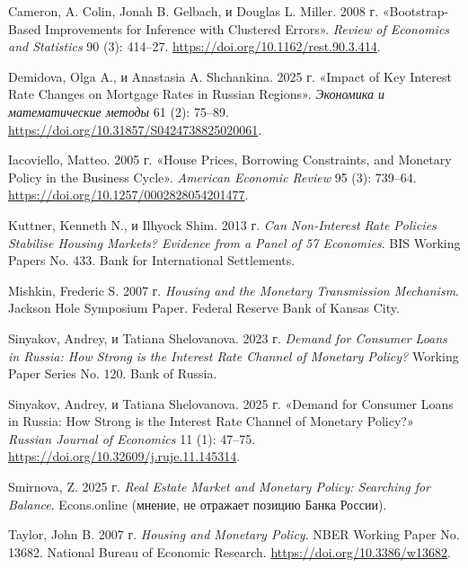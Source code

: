 \documentclass[
  russian,
  11pt,
]{article}
\newlength{\cslhangindent}
\newenvironment{CSLReferences}[2] %
 {\begin{list}{}{%
  \setlength{\itemindent}{0pt}
  \setlength{\leftmargin}{0pt}
  \setlength{\parsep}{0pt}
  \ifodd #1
   \setlength{\leftmargin}{\cslhangindent}
   \setlength{\itemindent}{-1\cslhangindent}
  \fi
  \setlength{\itemsep}{#2\baselineskip}}}
 {\end{list}}
\begin{document}
\protect{}\label{refs}
\begin{CSLReferences}{1}{1}
Cameron, A. Colin, Jonah B. Gelbach, и Douglas L. Miller. 2008 г.
{«Bootstrap-Based Improvements for Inference with Clustered Errors»}.
\emph{Review of Economics and Statistics} 90 (3): 414--27.
\url{https://doi.org/10.1162/rest.90.3.414}.

Demidova, Olga A., и Anastasia A. Shchankina. 2025 г. {«Impact of Key
Interest Rate Changes on Mortgage Rates in Russian Regions»}.
\emph{Экономика и математические методы} 61 (2): 75--89.
\url{https://doi.org/10.31857/S0424738825020061}.

Iacoviello, Matteo. 2005 г. {«House Prices, Borrowing Constraints, and
Monetary Policy in the Business Cycle»}. \emph{American Economic Review}
95 (3): 739--64. \url{https://doi.org/10.1257/0002828054201477}.

Kuttner, Kenneth N., и Ilhyock Shim. 2013 г. \emph{Can Non-Interest Rate
Policies Stabilise Housing Markets? Evidence from a Panel of 57
Economies}. BIS Working Papers No. 433. Bank for International
Settlements.

Mishkin, Frederic S. 2007 г. \emph{Housing and the Monetary Transmission
Mechanism}. Jackson Hole Symposium Paper. Federal Reserve Bank of Kansas
City.

Sinyakov, Andrey, и Tatiana Shelovanova. 2023 г. \emph{Demand for
Consumer Loans in Russia: How Strong is the Interest Rate Channel of
Monetary Policy?} Working Paper Series No. 120. Bank of Russia.

Sinyakov, Andrey, и Tatiana Shelovanova. 2025 г. {«Demand for Consumer
Loans in Russia: How Strong is the Interest Rate Channel of Monetary
Policy?»} \emph{Russian Journal of Economics} 11 (1): 47--75.
\url{https://doi.org/10.32609/j.ruje.11.145314}.

Smirnova, Z. 2025 г. \emph{Real Estate Market and Monetary Policy:
Searching for Balance}. Econs.online (мнение, не отражает позицию Банка
России).

Taylor, John B. 2007 г. \emph{Housing and Monetary Policy}. NBER Working
Paper No. 13682. National Bureau of Economic Research.
\url{https://doi.org/10.3386/w13682}.


\end{CSLReferences}
\end{document}

